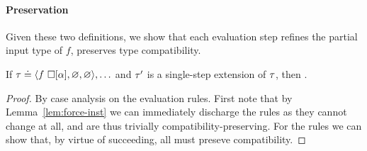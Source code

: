 \paragraph{Preservation}
Given these two definitions, we show that each evaluation step
refines the partial input type of $f$, \ie preserves type compatibility.
%
\begin{lem}
\label{lem:refine-partial}
If $\tau \doteq \langle f\ \square[\alpha], \varnothing, \varnothing \rangle,\ldots$ and
$\tau'$ is a single-step extension of $\tau$, %
%
%
then .
\end{lem}
\begin{proof}
  By case analysis on the evaluation rules.
  First note that by Lemma~\ref{lem:force-inst} we can immediately
  discharge the  rules as they cannot change
   at all, and are thus trivially
  compatibility-preserving. For the  rules we can
  show that, by virtue of \forcesym succeeding, all must preseve
  compatibility.
\end{proof}

